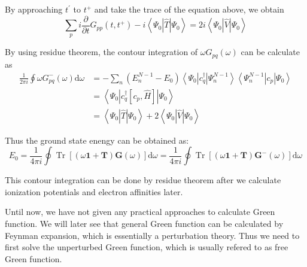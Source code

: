 \documentclass[bachelor, english]{ustcthesis}
\begin{document}
By approaching $t^{\prime}$ to $t^{+}$ and take the trace of the equation above, we obtain
$$
\sum_{p} i \frac{\partial}{\partial t} G_{p p}\left(t, t^{+}\right)-i\left\langle\Psi_{0}|\hat{T}| \Psi_{0}\right\rangle= 2 i\left\langle\Psi_{0}|\hat{V}| \Psi_{0}\right\rangle
$$

By using residue theorem, the contour integration of $\omega G_{pq}(\omega)$ can be calculate as
$$
\begin{aligned}
	\frac{1}{2 \pi i} \oint \omega G_{p q}^{-}(\omega) \mathrm{d} \omega
	&=-\sum_{n}\left(E_{n}^{N-1}-E_{0}\right)\left\langle\Psi_{0}\left|c_{q}^{\dagger}\right| \Psi_{n}^{N-1}\right\rangle\left\langle\Psi_{n}^{N-1}\left|c_{p}\right| \Psi_{0}\right\rangle
\\ 
&=\left\langle\Psi_{0}\left|c_{q}^{\dagger}\left[c_{p}, \hat{H}\right]\right| \Psi_{0}\right\rangle
\\
	&=\left\langle\Psi_{0}|\hat{T}| \Psi_{0}\right\rangle+ 2\left\langle\Psi_{0}|\hat{V}| \Psi_{0}\right\rangle
\end{aligned}
$$

Thus the ground state enengy can be obtained as:
$$
E_{0}=\frac{1}{4 \pi i} \oint \operatorname{Tr}[(\omega \mathbf{1}+\boldsymbol{T}) \boldsymbol{G}(\omega)] \mathrm{d} \omega=\frac{1}{4 \pi i} \oint \operatorname{Tr}\left[(\omega \mathbf{1}+\boldsymbol{T}) \boldsymbol{G}^{-}(\omega)\right] \mathrm{d} \omega
$$

This contour integration can be done by residue theorem after we calculate ionization potentials and electron affinities later.

Until now, we have not given any practical approaches to calculate Green function.
We will later see that general Green function can be calculated by Feynman expansion, which is essentially a perturbation theory.
Thus we need to first solve the unperturbed Green function, which is usually refered to as free Green function.






\appendix


\backmatter


\end{document}

